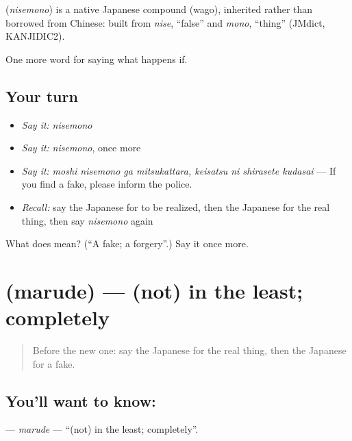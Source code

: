 \begin{cousinweb}
\textbf{} (\emph{nisemono}) is a native Japanese compound (wago), inherited rather than borrowed from Chinese: built from \emph{nise}, \textquotedblleft{}false\textquotedblright{} and \emph{mono}, \textquotedblleft{}thing\textquotedblright{} (JMdict, KANJIDIC2).
\end{cousinweb}

\begin{grammarlens}[title={What you've built}]
One more word for saying what happens if.
\end{grammarlens}

\subsection*{Your turn}
\begin{itemize}
\raggedright
  \item \emph{Say it:} \emph{nisemono}
  \item \emph{Say it:} \emph{nisemono}, once more
  \item \emph{Say it:} \emph{moshi nisemono ga mitsukattara, keisatsu ni shirasete kudasai} — If you find a fake, please inform the police.
  \item \emph{Recall:} say the Japanese for to be realized, then the Japanese for the real thing, then say \emph{nisemono} again
\end{itemize}

\begin{tcolorbox}[breakable,colback=teal!4,colframe=teal!35!black,title={Before you move on}]
What does  mean? (\textquotedblleft{}A fake; a forgery\textquotedblright{}.) Say it once more.
\end{tcolorbox}
\section[\texorpdfstring{\ja{まるで} (marude)}{まるで (marude)}]{ (marude) — (not) in the least; completely}

\label{lesson:JA-C525-marude}



\begin{quote}
Before the new one: say the Japanese for the real thing, then the Japanese for a fake.
\end{quote}

\subsection*{You'll want to know: }
\textbf{} — \emph{marude} — \textquotedblleft{}(not) in the least; completely\textquotedblright{}.

